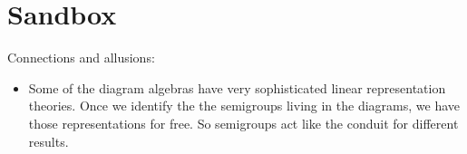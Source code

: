 \documentclass{amsart}
\begin{document}
\section{Sandbox}

Connections and allusions:
\begin{itemize}
\item Some of the diagram algebras have very sophisticated linear representation theories. Once we identify the the semigroups living in the diagrams, we have those representations for free. So semigroups act like the conduit for different results.
\end{itemize}



\end{document}
